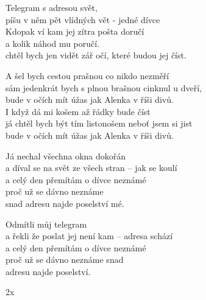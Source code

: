 
\ve{}
Telegram s adresou svět,\\
píšu v něm pět vlídných vět - jedné dívce \\
Kdopak ví kam jej zítra pošta doručí \\
a kolik náhod mu poručí. \\
chtěl bych jen vidět zář očí, které budou jej číst. 

\cho{}
A šel bych cestou prašnou co nikdo nezměří \\
sám jedenkrát bych s plnou brašnou cinknul u dveří,\\
bude v očích mít úžas jak Alenka v říši divů. \\
I když dá mi košem až řádky bude číst \\
já chtěl bych být tím listonošem neboť jsem si jist \\
bude v očích mít úžas jak Alenka v říši divů. 

\ve{}
Já nechal všechna okna dokořán \\
a díval se na svět ze všech stran -- jak se koulí \\
a celý den přemítám o dívce neznámé \\
proč už se dávno neznáme \\
snad adresu najde poselství mé. 

\cho{}

\ve{}
Odmítli můj telegram\\
a řekli že poslat jej není kam -- adresa schází \\
a celý den přemítám o dívce neznámé \\
proč už se dávno neznáme snad \\
adresu najde poselství.

\cho{}2x
\esong{}
